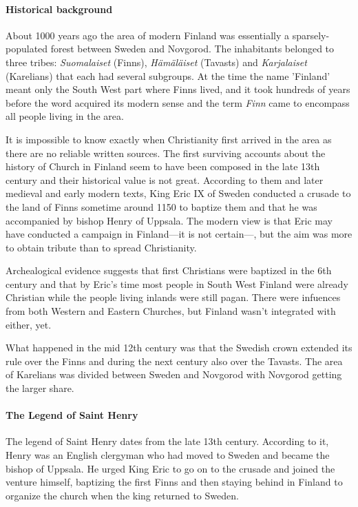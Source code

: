 \documentclass[a4paper, 12pt]{article}
\begin{document}
\paragraph{Historical background}

About 1000 years ago the area of modern Finland was essentially a
sparsely-populated forest between Sweden and Novgorod. The inhabitants
belonged to three tribes: \emph{Suomalaiset} (Finns),
\emph{Hämäläiset} (Tavasts) and \emph{Karjalaiset} (Karelians) that
each had several subgroups. At the time the name 'Finland' meant only
the South West part where Finns lived, and it took hundreds of years
before the word acquired its modern sense and the term \emph{Finn}
came to encompass all people living in the area.

It is impossible to know exactly when Christianity first arrived in
the area as there are no reliable written sources. The first surviving
accounts about the history of Church in Finland seem to have been
composed in the late 13th century and their historical value is not
great. According to them and later medieval and early modern texts,
King Eric IX of Sweden conducted a crusade to the land of Finns
sometime around 1150 to baptize them and that he was accompanied by
bishop Henry of Uppsala. The modern view is that Eric may have
conducted a campaign in Finland—it is not certain—, but the aim was
more to obtain tribute than to spread Christianity.

Archealogical evidence suggests that first Christians were baptized in
the 6th century and that by Eric's time most people in South West
Finland were already Christian while the people living inlands were
still pagan. There were infuences from both Western and Eastern
Churches, but Finland wasn't integrated with either, yet.

What happened in the mid 12th century was that the Swedish crown
extended its rule over the Finns and during the next century also over
the Tavasts. The area of Karelians was divided between Sweden and
Novgorod with Novgorod getting the larger share.

\paragraph{The Legend of Saint Henry} The legend of Saint Henry dates
from the late 13th century. According to it, Henry was an English
clergyman who had moved to Sweden and became the bishop of Uppsala. He
urged King Eric to go on to the crusade and joined the venture
himself, baptizing the first Finns and then staying behind in Finland
to organize the church when the king returned to Sweden.
\end{document}
